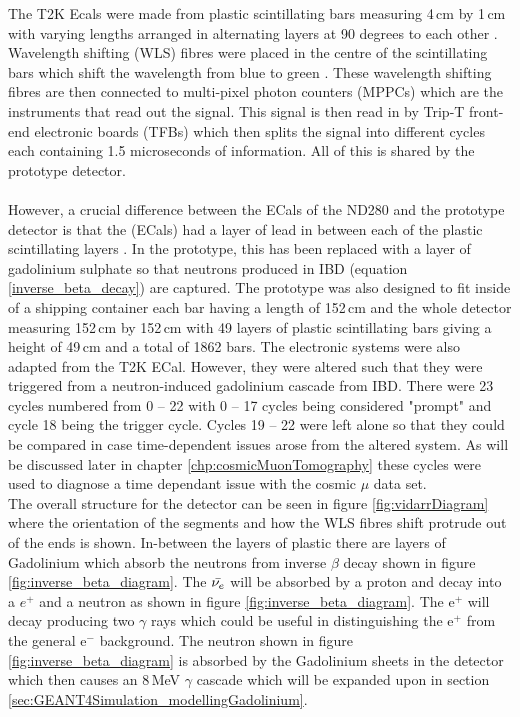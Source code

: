 The T2K Ecals were made from plastic scintillating bars measuring 4\,cm by 1\,cm with varying lengths arranged in alternating layers at 90 degrees to each other \cite{Allan_2013}. Wavelength shifting (WLS) fibres were placed in the centre of the scintillating bars which shift the wavelength from blue to green \cite{Allan_2013}. These wavelength shifting fibres are then connected to multi-pixel photon counters (MPPCs) which are the instruments that read out the signal. This signal is then read in by Trip-T front-end electronic boards (TFBs) which then splits the signal into different cycles each containing 1.5 microseconds of information. All of this is shared by the prototype detector. 
\\\\However, a crucial difference between the ECals of the ND280 and the prototype detector is that the (ECals) had a layer of lead in between each of the plastic scintillating layers \cite{Allan_2013}. In the prototype, this has been replaced with a layer of gadolinium sulphate so that neutrons produced in IBD (equation \ref{inverse_beta_decay}) are captured. The prototype was also designed to fit inside of a shipping container each bar having a length of 152\,cm and the whole detector measuring 152\,cm by 152\,cm with 49 layers of plastic scintillating bars giving a height of 49\,cm and a total of 1862 bars. The electronic systems were also adapted from the T2K ECal. However, they were altered such that they were triggered from a neutron-induced gadolinium cascade from IBD. There were 23 cycles numbered from 0 -- 22 with 0 -- 17 cycles being considered "prompt" and cycle 18 being the trigger cycle. Cycles 19 -- 22 were left alone so that they could be compared in case time-dependent issues arose from the altered system. As will be discussed later in chapter \ref{chp:cosmicMuonTomography} these cycles were used to diagnose a time dependant issue with the cosmic $\mu$ data set.
\\The overall structure for the detector can be seen in figure \ref{fig:vidarrDiagram} where the orientation of the segments and how the WLS fibres shift protrude out of the ends is shown. In-between the layers of plastic there are layers of Gadolinium which absorb the neutrons from inverse $\beta$ decay shown in figure \ref{fig:inverse_beta_diagram}. The $\Bar{\nu_e}$ will be absorbed by a proton and decay into a $e^+$ and a neutron as shown in figure \ref{fig:inverse_beta_diagram}. The e$^+$ will decay producing two $\gamma$ rays which could be useful in distinguishing the e$^+$ from the general e$^-$ background. The neutron shown in figure \ref{fig:inverse_beta_diagram} is absorbed by the Gadolinium sheets in the detector which then causes an 8\,MeV $\gamma$ cascade which will be expanded upon in section \ref{sec:GEANT4Simulation_modellingGadolinium}.  


